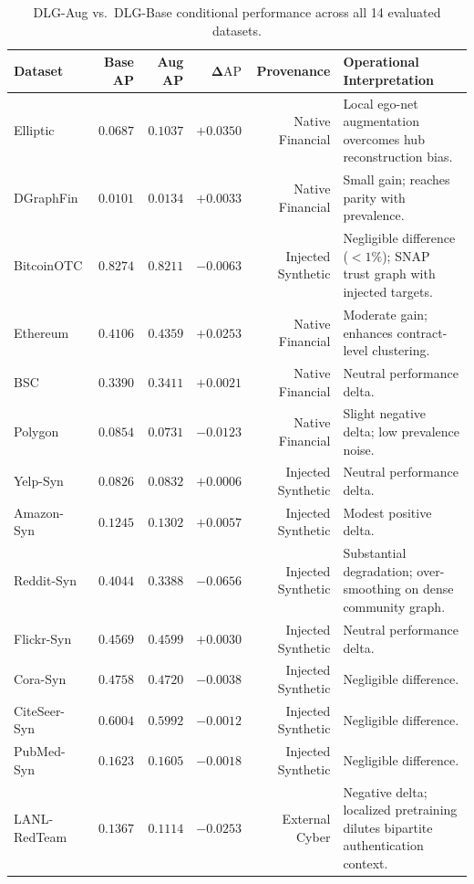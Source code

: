 \documentclass[11pt,a4paper]{article}
\begin{document}
\begin{table}[htbp]
\centering\small
\caption{DLG-Aug vs.\ DLG-Base conditional performance across all 14 evaluated datasets.}
\label{tab:conditional_delta}
\begin{tabularx}{\textwidth}{lrrrrX}\toprule
\textbf{Dataset} & \textbf{Base AP} & \textbf{Aug AP} & $\mathbf{\Delta\mathrm{AP}}$ & \textbf{Provenance} & \textbf{Operational Interpretation} \\\midrule
Elliptic & $0.0687$ & $0.1037$ & $\mathbf{+0.0350}$ & Native Financial & Local ego-net augmentation overcomes hub reconstruction bias. \\
DGraphFin & $0.0101$ & $0.0134$ & $+0.0033$ & Native Financial & Small gain; reaches parity with prevalence. \\
BitcoinOTC & $0.8274$ & $0.8211$ & $-0.0063$ & Injected Synthetic & Negligible difference ($<1\%$); SNAP trust graph with injected targets. \\
Ethereum & $0.4106$ & $0.4359$ & $\mathbf{+0.0253}$ & Native Financial & Moderate gain; enhances contract-level clustering. \\
BSC & $0.3390$ & $0.3411$ & $+0.0021$ & Native Financial & Neutral performance delta. \\
Polygon & $0.0854$ & $0.0731$ & $-0.0123$ & Native Financial & Slight negative delta; low prevalence noise. \\
Yelp-Syn & $0.0826$ & $0.0832$ & $+0.0006$ & Injected Synthetic & Neutral performance delta. \\
Amazon-Syn & $0.1245$ & $0.1302$ & $+0.0057$ & Injected Synthetic & Modest positive delta. \\
Reddit-Syn & $0.4044$ & $0.3388$ & $\mathbf{-0.0656}$ & Injected Synthetic & Substantial degradation; over-smoothing on dense community graph. \\
Flickr-Syn & $0.4569$ & $0.4599$ & $+0.0030$ & Injected Synthetic & Neutral performance delta. \\
Cora-Syn & $0.4758$ & $0.4720$ & $-0.0038$ & Injected Synthetic & Negligible difference. \\
CiteSeer-Syn & $0.6004$ & $0.5992$ & $-0.0012$ & Injected Synthetic & Negligible difference. \\
PubMed-Syn & $0.1623$ & $0.1605$ & $-0.0018$ & Injected Synthetic & Negligible difference. \\\midrule
LANL-RedTeam & $0.1367$ & $0.1114$ & $\mathbf{-0.0253}$ & External Cyber & Negative delta; localized pretraining dilutes bipartite authentication context. \\\bottomrule
\end{tabularx}
\end{table}
\end{document}
